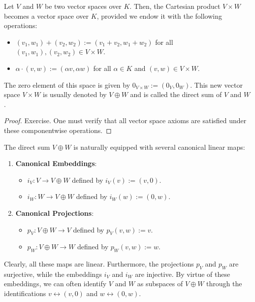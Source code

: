 \begin{proposition}
  Let $V$ and $W$ be two vector spaces over $K$. Then, the Cartesian product $V \times W$ becomes a vector space over $K$, provided we endow it with the following operations:
  \begin{itemize}
    \item $(v_1, w_1) + (v_2, w_2) := (v_1 + v_2, w_1 + w_2)$ for all $(v_1, w_1), (v_2, w_2) \in V \times W$.
    \item $\alpha \cdot (v, w) := (\alpha v, \alpha w)$ for all $\alpha \in K$ and $(v, w) \in V \times W$.
  \end{itemize}
  The zero element of this space is given by $0_{V \times W} := (0_V, 0_W)$. This new vector space $V \times W$ is usually denoted by $V \oplus W$ and is called the direct sum of $V$ and $W$.
\end{proposition}

\begin{proof}
  Exercise. One must verify that all vector space axioms are satisfied under these componentwise operations.
\end{proof}

\begin{remark}
  The direct sum $V \oplus W$ is naturally equipped with several canonical linear maps:
  \begin{enumerate}
    \item \textbf{Canonical Embeddings}:
    \begin{itemize}
      \item $i_V \colon V \to V \oplus W$ defined by $i_V(v) := (v, 0)$.
      \item $i_W \colon W \to V \oplus W$ defined by $i_W(w) := (0, w)$.
    \end{itemize}
    \item \textbf{Canonical Projections}:
    \begin{itemize}
      \item $p_V \colon V \oplus W \to V$ defined by $p_V(v, w) := v$.
      \item $p_W \colon V \oplus W \to W$ defined by $p_W(v, w) := w$.
    \end{itemize}
  \end{enumerate}
  Clearly, all these maps are linear. Furthermore, the projections $p_V$ and $p_W$ are surjective, while the embeddings $i_V$ and $i_W$ are injective. By virtue of these embeddings, we can often identify $V$ and $W$ as subspaces of $V \oplus W$ through the identifications $v \leftrightarrow (v, 0)$ and $w \leftrightarrow (0, w)$.
\end{remark}

